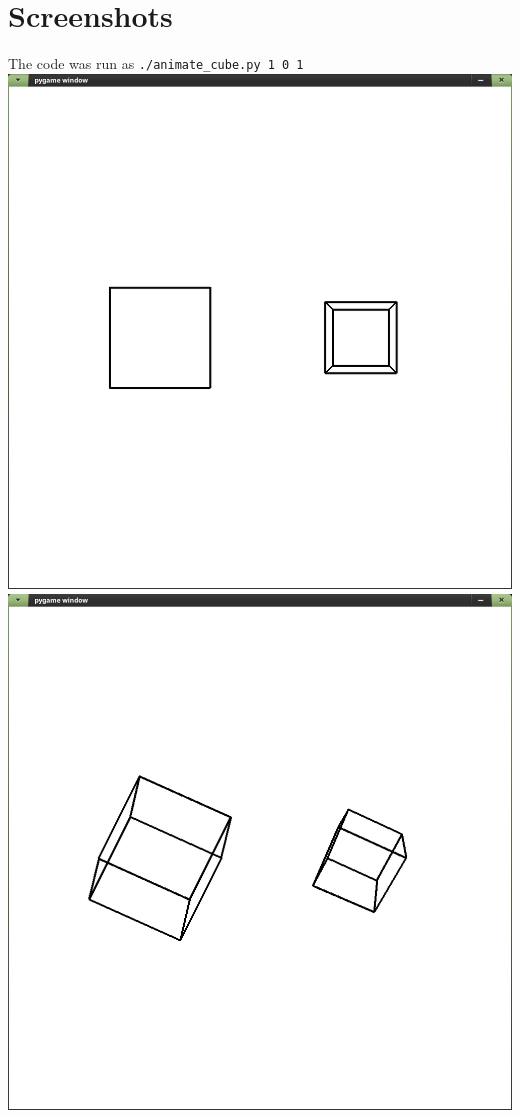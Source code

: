 \documentclass[a4paper,14pt,english,crop=false]{standalone}
\begin{document}
\section{Screenshots}
The code was run as \texttt{./animate\_cube.py 1 0 1} \\
\includegraphics[width=\textwidth]{figures/pygame_window_061}
\includegraphics[width=\textwidth]{figures/pygame_window_062}
\end{document}
